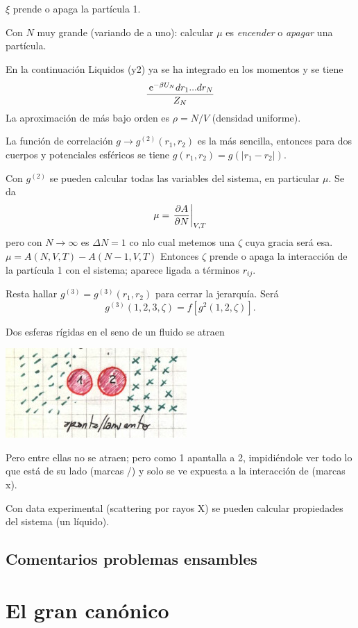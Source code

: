 \documentclass[10pt,oneside]{CBFT_book}
\begin{document}
$\xi$ prende o apaga la partícula 1.

Con $N$ muy grande (variando de a uno): calcular $\mu$ es \textit{encender} o \textit{apagar} una partícula.

En la continuación Liquidos (y2) ya se ha integrado en los momentos y se tiene
\[
	\frac{ \:\mathrm{e}^{- \beta U_N} dr_1 ... dr_N}{Z_N}
\]
La aproximación de más bajo orden es $\rho = N/V$ (densidad uniforme).

La función de correlación $ g \to g^{(2)} (r_1,r_2)$ es la más sencilla, entonces para dos cuerpos y potenciales
esféricos se tiene $ g (r_1,r_2) = g (|r_1 - r_2|) $.

Con $ g^{(2)} $ se pueden calcular todas las variables del sistema, en particular $\mu$.
Se da
\[
	\mu = \left.\frac{\partial^{\hspace{-0.05em}} {A}}{\partial {N}^{\hspace{-0.05em}}}\right|_{V,T}
\]
pero con $N\to\infty$ es $\Delta N= 1$ co nlo cual metemos una $\zeta$ cuya gracia será esa.
$\mu = A(N,V,T) - A(N-1,V,T) $
Entonces $\zeta$ prende o apaga la interacción de la partícula 1 con el sistema; aparece ligada a 
términos $r_{ij}$.

Resta hallar $ g^{(3)} = g^{(3)} (r_1,r_2)  $ para cerrar la jerarquía. Será
\[
	 g^{(3)} (1,2,3,\zeta) = f[ g^2(1,2,\zeta)] .
\]


Dos esferas rígidas en el seno de un fluido se atraen 

\includegraphics[scale=0.5]{images/1606329426.jpg} 

Pero entre ellas no se atraen; pero como 1 apantalla a 2, impidiéndole ver todo lo que está de su
lado (marcas /) y solo se ve expuesta a la interacción de (marcas x).

Con data experimental (scattering por rayos X) se pueden calcular propiedades del sistema (un líquido).


\subsection{Comentarios problemas ensambles}

\section{El gran canónico}
\end{document}
